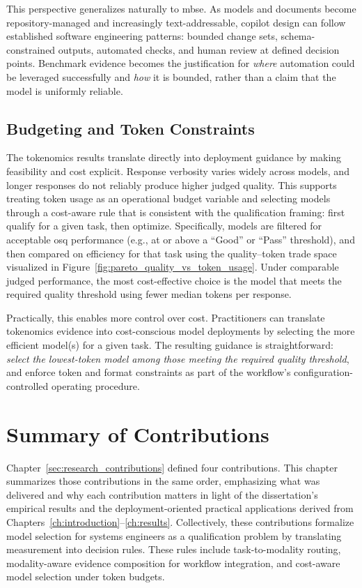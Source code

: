 This perspective generalizes naturally to \ac{mbse}. As models and documents become repository-managed and increasingly text-addressable, copilot design can follow established software engineering patterns: bounded change sets, schema-constrained outputs, automated checks, and human review at defined decision points. Benchmark evidence becomes the justification for \emph{where} automation could be leveraged successfully and \emph{how} it is bounded, rather than a claim that the model is uniformly reliable.

\subsection{Budgeting and Token Constraints}

The tokenomics results translate directly into deployment guidance by making feasibility and cost explicit. Response verbosity varies widely across models, and longer responses do not reliably produce higher judged quality. This supports treating token usage as an operational budget variable and selecting models through a cost-aware rule that is consistent with the qualification framing: first qualify for a given task, then optimize. Specifically, models are filtered for acceptable \ac{osq} performance (e.g., at or above a ``Good'' or ``Pass'' threshold), and then compared on efficiency for that task using the quality--token trade space visualized in Figure~\ref{fig:pareto_quality_vs_token_usage}. Under comparable judged performance, the most cost-effective choice is the model that meets the required quality threshold using fewer median tokens per response.

Practically, this enables more control over cost. Practitioners can translate tokenomics evidence into cost-conscious model deployments by selecting the more efficient model(s) for a given task. The resulting guidance is straightforward: \emph{select the lowest-token model among those meeting the required quality threshold}, and enforce token and format constraints as part of the workflow’s configuration-controlled operating procedure.


\section{Summary of Contributions}\label{sec:summary_contributions}

Chapter~\ref{sec:research_contributions} defined four contributions. This chapter summarizes those contributions in the same order, emphasizing what was delivered and why each contribution matters in light of the dissertation’s empirical results and the deployment-oriented practical applications derived from Chapters~\ref{ch:introduction}--\ref{ch:results}. Collectively, these contributions formalize model selection for systems engineers as a qualification problem by translating measurement into decision rules. These rules include task-to-modality routing, modality-aware evidence composition for workflow integration, and cost-aware model selection under token budgets. 

